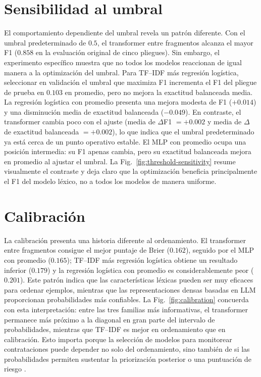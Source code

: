 \section{Sensibilidad al umbral}
El comportamiento dependiente del umbral revela un patrón diferente. Con el umbral predeterminado de $0.5$, el transformer entre fragmentos alcanza el mayor F1 ($0.858$ en la evaluación original de cinco pliegues). Sin embargo, el experimento específico muestra que no todos los modelos reaccionan de igual manera a la optimización del umbral. Para TF--IDF más regresión logística, seleccionar en validación el umbral que maximiza F1 incrementa el F1 del pliegue de prueba en $0.103$ en promedio, pero no mejora la exactitud balanceada media. La regresión logística con promedio presenta una mejora modesta de F1 ($+0.014$) y una disminución media de exactitud balanceada ($-0.049$). En contraste, el transformer cambia poco con el ajuste (media de $\Delta$F1 $=+0.002$ y media de $\Delta$ de exactitud balanceada $=+0.002$), lo que indica que el umbral predeterminado ya está cerca de un punto operativo estable. El MLP con promedio ocupa una posición intermedia: su F1 apenas cambia, pero su exactitud balanceada mejora en promedio al ajustar el umbral. La Fig.~\ref{fig:threshold-sensitivity} resume visualmente el contraste y deja claro que la optimización beneficia principalmente el F1 del modelo léxico, no a todos los modelos de manera uniforme.

\section{Calibración}
La calibración presenta una historia diferente al ordenamiento. El transformer entre fragmentos consigue el mejor puntaje de Brier ($0.162$), seguido por el MLP con promedio ($0.165$); TF--IDF más regresión logística obtiene un resultado inferior ($0.179$) y la regresión logística con promedio es considerablemente peor ($0.201$). Este patrón indica que las características léxicas pueden ser muy eficaces para ordenar ejemplos, mientras que las representaciones densas basadas en LLM proporcionan probabilidades más confiables. La Fig.~\ref{fig:calibration} concuerda con esta interpretación: entre las tres familias más informativas, el transformer permanece más próximo a la diagonal en gran parte del intervalo de probabilidades, mientras que TF--IDF es mejor en ordenamiento que en calibración. Esto importa porque la selección de modelos para monitorear contrataciones puede depender no solo del ordenamiento, sino también de si las probabilidades permiten sustentar la priorización posterior o una puntuación de riesgo \cite{silvafilho2023calibration}.


